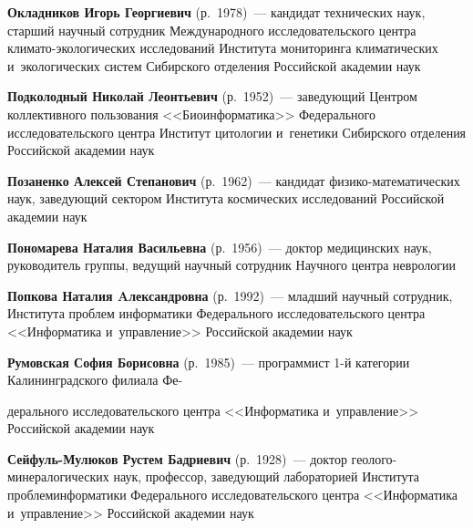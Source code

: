 \begin{multicols}{2}
\vspace*{1pt}

\noindent
\textbf{Окладников Игорь Георгиевич} (р.\ 1978)~---
кандидат технических наук, старший научный сотрудник Международного 
исследовательского центра кли\-ма\-то-эко\-ло\-ги\-че\-ских исследований 
Института мониторинга климатических и~экологических систем Сибирского отделения 
Российской академии наук 

\vspace*{1pt}
 
  \noindent
\textbf{Подколодный Николай Леонтьевич} (р.\ 1952)~---
заведующий Центром коллективного пользования <<Биоинформатика>> 
Федерального исследовательского центра Институт цитологии и~генетики 
Сибирского отделения Российской академии наук

\vspace*{1pt}

 \noindent
\textbf{Позаненко Алексей Степанович} (р.\ 1962)~---
 кандидат фи\-зи\-ко-ма\-те\-ма\-ти\-че\-ских наук,  заведующий сектором 
 Института космических исследований Российской академии наук

\vspace*{1pt}

\noindent
\textbf{Пономарева Наталия Васильевна} (р.\ 1956)~---
доктор медицинских наук, руководитель группы, ведущий научный сотрудник 
Научного центра неврологии

\vspace*{1pt}

\noindent
\textbf{Попкова Наталия Aлександровна} (р.\ 1992)~--- младший научный сотрудник,
Института проб\-лем 
информатики Федерального исследовательского цент\-ра <<Информатика и~управ\-ление>>
Российской академии наук


\vspace*{1pt}

\noindent
\textbf{Румовская София Борисовна} (р.\ 1985)~---
программист 1-й категории Калининградского филиала Фе-\linebreak\vspace*{-12pt}

\columnbreak

\noindent
дерального исследовательского 
центра <<Информатика и~управ\-ле\-ние>> Российской академии наук

\vspace*{1pt}
 
\noindent
\textbf{Сейфуль-Мулюков Рустем Бадриевич} (р.\ 1928)~--- 
доктор гео\-ло\-го-ми\-не\-ра\-ло\-ги\-че\-ских наук, профессор, заведующий 
лабораторией Института проб\-лем\linebreak информатики Федерального исследовательского 
центра <<Информатика и~управ\-ле\-ние>> Российской академии наук


\end{multicols}
